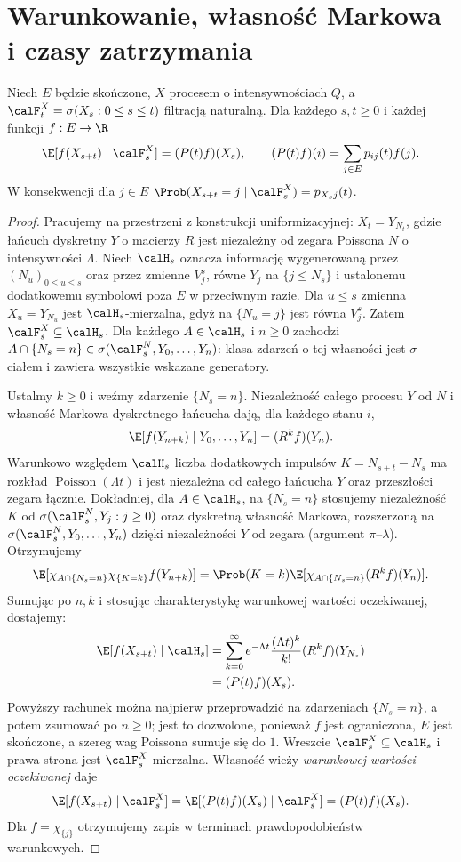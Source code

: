 \section{Warunkowanie, własność Markowa i czasy zatrzymania}
\begin{twierdzenie}
Niech $E$ będzie skończone, $X$ procesem o intensywnościach $Q$,
a $\calF_t^X=\sigma(X_s:0\le s\le t)$ filtracją naturalną.
Dla każdego $s,t\ge0$ i każdej funkcji $f:E\to\R$
\[
\E[f(X_{s+t})\mid\calF_s^X]=(P(t)f)(X_s),\qquad
(P(t)f)(i)=\sum_{j\in E}p_{ij}(t)f(j).
\]
W konsekwencji dla $j\in E$
$\Prob(X_{s+t}=j\mid\calF_s^X)=p_{X_sj}(t)$.
\end{twierdzenie}
\begin{proof}
Pracujemy na przestrzeni z konstrukcji uniformizacyjnej:
$X_t=Y_{N_t}$, gdzie łańcuch dyskretny $Y$ o macierzy $R$
jest niezależny od zegara Poissona $N$ o intensywności $\Lambda$.
Niech $\calH_s$ oznacza informację wygenerowaną przez
$(N_u)_{0\le u\le s}$ oraz przez zmienne
$V_j^s$, równe $Y_j$ na $\{j\le N_s\}$ i ustalonemu
dodatkowemu symbolowi poza $E$ w przeciwnym razie.
Dla $u\le s$ zmienna $X_u=Y_{N_u}$ jest
$\calH_s$-mierzalna, gdyż na $\{N_u=j\}$ jest równa
$V_j^s$. Zatem $\calF_s^X\subseteq\calH_s$.
Dla każdego $A\in\calH_s$ i $n\ge0$ zachodzi
$A\cap\{N_s=n\}\in\sigma(\calF_s^N,Y_0,\ldots,Y_n)$:
klasa zdarzeń o tej własności jest $\sigma$-ciałem
i zawiera wszystkie wskazane generatory.

Ustalmy $k\ge0$ i weźmy zdarzenie $\{N_s=n\}$.
Niezależność całego procesu $Y$ od $N$ i własność
Markowa dyskretnego łańcucha dają, dla każdego stanu $i$,
\[
\E[f(Y_{n+k})\mid Y_0,\ldots,Y_n]=(R^kf)(Y_n).
\]
Warunkowo względem $\calH_s$ liczba dodatkowych impulsów
$K=N_{s+t}-N_s$ ma rozkład $\operatorname{Poisson}(\Lambda t)$
i jest niezależna od całego łańcucha $Y$ oraz przeszłości
zegara łącznie. Dokładniej, dla $A\in\calH_s$,
na $\{N_s=n\}$ stosujemy niezależność $K$ od
$\sigma(\calF_s^N,Y_j:j\ge0)$ oraz dyskretną własność
Markowa, rozszerzoną na $\sigma(\calF_s^N,Y_0,\ldots,Y_n)$
dzięki niezależności $Y$ od zegara (argument $\pi$--$\lambda$).
Otrzymujemy
\[
\E[\chi_{A\cap\{N_s=n\}}\chi_{\{K=k\}}f(Y_{n+k})]
=\Prob(K=k)\E[\chi_{A\cap\{N_s=n\}}(R^kf)(Y_n)].
\]
Sumując po $n,k$ i stosując charakterystykę
warunkowej wartości oczekiwanej, dostajemy:
\[
\begin{aligned}
\E[f(X_{s+t})\mid\calH_s]
 &=\sum_{k=0}^\infty
 e^{-\Lambda t}\frac{(\Lambda t)^k}{k!}
 (R^kf)(Y_{N_s})\\
 &= (P(t)f)(X_s).
\end{aligned}
\]
Powyższy rachunek można najpierw przeprowadzić na zdarzeniach
$\{N_s=n\}$, a potem zsumować po $n\ge0$; jest to dozwolone,
ponieważ $f$ jest ograniczona, $E$ jest skończone,
a szereg wag Poissona sumuje się do $1$.
Wreszcie $\calF_s^X\subseteq\calH_s$ i prawa strona
jest $\calF_s^X$-mierzalna. Własność wieży
\emph{warunkowej wartości oczekiwanej} daje
\[
\E[f(X_{s+t})\mid\calF_s^X]
=\E[(P(t)f)(X_s)\mid\calF_s^X]
=(P(t)f)(X_s).
\]
Dla $f=\chi_{\{j\}}$ otrzymujemy zapis
w terminach prawdopodobieństw warunkowych.
\end{proof}


